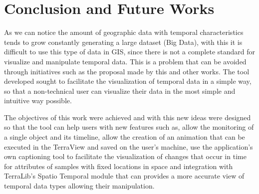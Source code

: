\documentclass[12pt]{article}
\begin{document}
\section{Conclusion and Future Works}

As we can notice the amount of geographic data with temporal characteristics tends to grow constantly generating a large dataset (Big Data), with this it is difficult to use this type of data in GIS, since there is not a complete standard for visualize and manipulate temporal data. This is a problem that can be avoided through initiatives such as the proposal made by this and other works. The tool developed sought to facilitate the visualization of temporal data in a simple way, so that a non-technical user can visualize their data in the most simple and intuitive way possible.

The objectives of this work were achieved and with this new ideas were designed so that the tool can help users with new features such as, allow the monitoring of a single object and its timeline, allow the creation of an animation that can be executed in the TerraView and saved on the user's machine, use the application's own captioning tool to facilitate the visualization of changes that occur in time for attributes of samples with fixed locations in space and integration with TerraLib's Spatio Temporal module that can provides a more accurate view of temporal data types allowing their manipulation.



\end{document}
